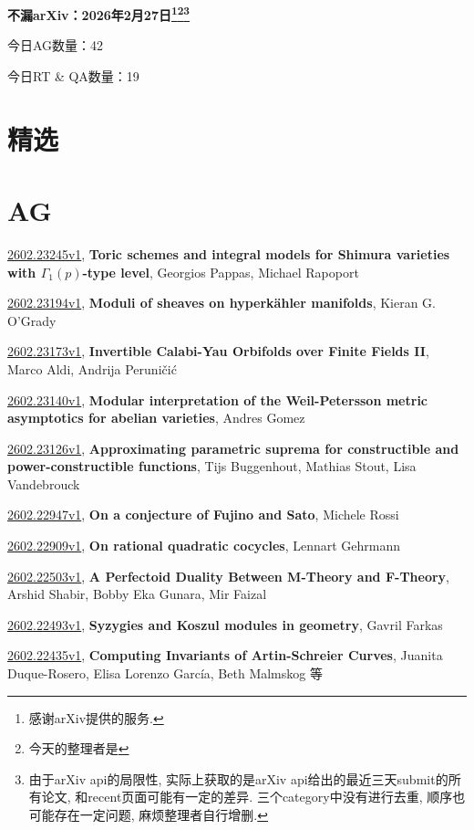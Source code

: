 \documentclass[9pt, a4paper]{article}
\theoremstyle{plain}
\theoremstyle{definition}
\theoremstyle{remark}
\newcommand{\arxiv}[3]{\href{https://arxiv.org/abs/#1}{#1}, \textbf{\textcolor{arxivblue}{#2}}, #3}
\newcommand{\AGnumber}{42}
\newcommand{\RTQAnumber}{19}
\newcommand{\NewestDate}{2026年2月27日}
\newcommand{\todayarXiver}{} %
\begin{document}
\begin{center}
    \Huge\textbf{不漏arXiv：\NewestDate\footnote{感谢arXiv提供的服务.}\footnote{今天的整理者是\todayarXiver}\footnote{由于arXiv api的局限性, 实际上获取的是arXiv api给出的最近三天submit的所有论文, 和recent页面可能有一定的差异. 三个category中没有进行去重, 顺序也可能存在一定问题, 麻烦整理者自行增删.}} \\
\end{center}

\setcounter{section}{-1}

\begin{center}
    今日AG数量：\AGnumber
    
    今日RT \& QA数量：\RTQAnumber
    
\end{center}


\section{精选}


\section{AG}
\arxiv{2602.23245v1}{Toric schemes and integral models for Shimura varieties with $Γ_1(p)$-type level}{Georgios Pappas, Michael Rapoport}

\arxiv{2602.23194v1}{Moduli of sheaves on hyperkähler manifolds}{Kieran G. O'Grady}

\arxiv{2602.23173v1}{Invertible Calabi-Yau Orbifolds over Finite Fields II}{Marco Aldi, Andrija Peruničić}

\arxiv{2602.23140v1}{Modular interpretation of the Weil-Petersson metric asymptotics for abelian varieties}{Andres Gomez}

\arxiv{2602.23126v1}{Approximating parametric suprema for constructible and power-constructible functions}{Tijs Buggenhout, Mathias Stout, Lisa Vandebrouck}

\arxiv{2602.22947v1}{On a conjecture of Fujino and Sato}{Michele Rossi}

\arxiv{2602.22909v1}{On rational quadratic cocycles}{Lennart Gehrmann}

\arxiv{2602.22503v1}{A Perfectoid Duality Between M-Theory and F-Theory}{Arshid Shabir, Bobby Eka Gunara, Mir Faizal}

\arxiv{2602.22493v1}{Syzygies and Koszul modules in geometry}{Gavril Farkas}

\arxiv{2602.22435v1}{Computing Invariants of Artin-Schreier Curves}{Juanita Duque-Rosero, Elisa Lorenzo García, Beth Malmskog 等}
\end{document}
